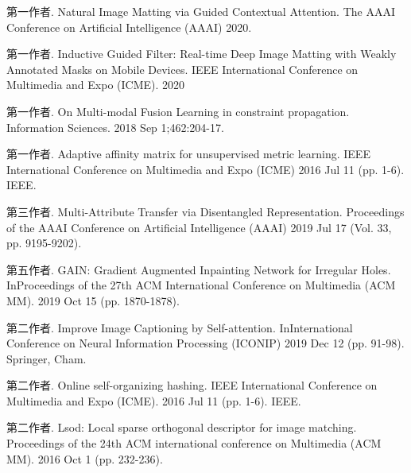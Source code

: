 

\begin{publications}
  \item 第一作者. Natural Image Matting via Guided Contextual Attention. The AAAI Conference on Artificial Intelligence (AAAI) 2020.
  \item 第一作者. Inductive Guided Filter: Real-time Deep Image Matting with Weakly Annotated Masks on Mobile Devices. IEEE International Conference on Multimedia and Expo (ICME). 2020
  \item 第一作者. On Multi-modal Fusion Learning in constraint propagation. Information Sciences. 2018 Sep 1;462:204-17.
  \item 第一作者. Adaptive affinity matrix for unsupervised metric learning. IEEE International Conference on Multimedia and Expo (ICME) 2016 Jul 11 (pp. 1-6). IEEE.
  \item 第三作者. Multi-Attribute Transfer via Disentangled Representation. Proceedings of the AAAI Conference on Artificial Intelligence (AAAI) 2019 Jul 17 (Vol. 33, pp. 9195-9202).
  \item 第五作者. GAIN: Gradient Augmented Inpainting Network for Irregular Holes. InProceedings of the 27th ACM International Conference on Multimedia (ACM MM). 2019 Oct 15 (pp. 1870-1878).
  \item 第二作者. Improve Image Captioning by Self-attention. InInternational Conference on Neural Information Processing (ICONIP) 2019 Dec 12 (pp. 91-98). Springer, Cham.
  \item 第二作者. Online self-organizing hashing. IEEE International Conference on Multimedia and Expo (ICME). 2016 Jul 11 (pp. 1-6). IEEE.
  \item 第二作者. Lsod: Local sparse orthogonal descriptor for image matching. Proceedings of the 24th ACM international conference on Multimedia (ACM MM). 2016 Oct 1 (pp. 232-236).
\end{publications}

